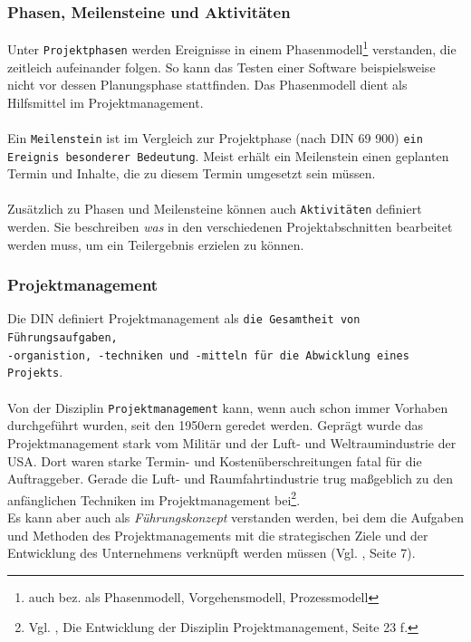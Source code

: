 \documentclass[12pt]{scrartcl}
\begin{document}
\subsubsection{Phasen, Meilensteine und Aktivitäten}

Unter \texttt{Projektphasen} werden Ereignisse in einem Phasenmodell\footnote{auch bez. als Phasenmodell, Vorgehensmodell, Prozessmodell} verstanden, die zeitleich aufeinander folgen. So kann das Testen einer Software beispielsweise nicht vor dessen Planungsphase stattfinden. Das Phasenmodell dient als Hilfsmittel im Projektmanagement. \\
\\
Ein \texttt{Meilenstein} ist im Vergleich zur Projektphase (nach DIN 69 900) \texttt{ein Ereignis besonderer Bedeutung}. Meist erhält ein Meilenstein einen geplanten Termin und Inhalte, die zu diesem Termin umgesetzt sein müssen. \\
\\
Zusätzlich zu Phasen und Meilensteine können auch \texttt{Aktivitäten} definiert werden. Sie beschreiben \textit{was} in den verschiedenen Projektabschnitten bearbeitet werden muss, um ein Teilergebnis erzielen zu können.  

\subsubsection{Projektmanagement}
Die DIN definiert Projektmanagement als \texttt{die Gesamtheit von Führungsaufgaben,\\ -organistion, -techniken und -mitteln für die Abwicklung eines Projekts}.\\
\\
Von der Disziplin \texttt{Projektmanagement} kann, wenn auch schon immer Vorhaben durchgeführt wurden, seit den 1950ern geredet werden. Geprägt wurde das Projektmanagement stark vom Militär und der Luft- und Weltraumindustrie der USA. Dort waren starke Termin- und Kostenüberschreitungen fatal für die Auftraggeber. Gerade die Luft- und Raumfahrtindustrie trug maßgeblich zu den anfänglichen Techniken im Projektmanagement bei\footnote{Vgl. \cite{proj_zum_erfolg_fuehren}, Die Entwicklung der Disziplin Projektmanagement, Seite 23 f.}. 
\\
Es kann aber auch als \textit{Führungskonzept} verstanden werden, bei dem die Aufgaben und Methoden des Projektmanagements mit die strategischen Ziele und der Entwicklung des Unternehmens verknüpft werden müssen (Vgl. \cite{scriptPM}, Seite 7). 
\end{document}
